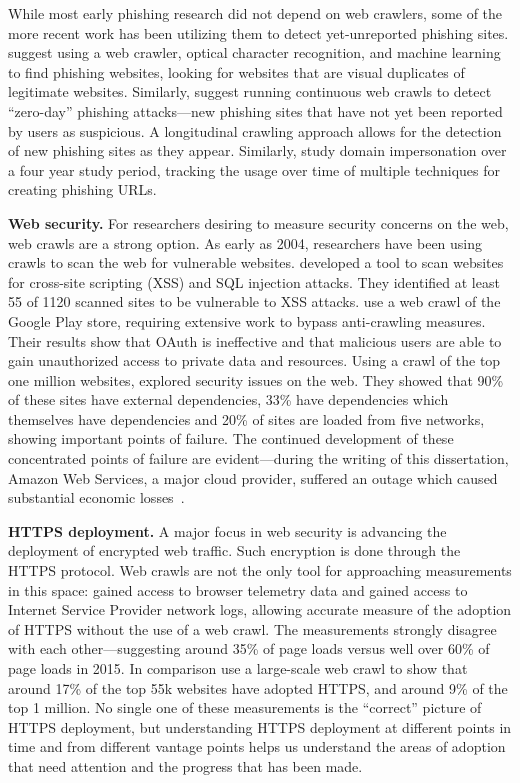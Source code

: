 While most early phishing research did not depend on web crawlers, some of the more recent work has been utilizing them to detect yet-unreported phishing sites. \citet{tian2018needle} suggest using a web crawler, optical character recognition, and machine learning to find phishing websites, looking for websites that are visual duplicates of legitimate websites. Similarly, \citet{nathezhtha2019wc} suggest running continuous web crawls to detect ``zero-day'' phishing attacks---new phishing sites that have not yet been reported by users as suspicious. A longitudinal crawling approach allows for the detection of new phishing sites as they appear. Similarly, \citet{roberts2019you} study domain impersonation over a four year study period, tracking the usage over time of multiple techniques for creating phishing URLs. 

\textbf{Web security.}
For researchers desiring to measure security concerns on the web, web crawls are a strong option. As early as 2004, researchers have been using crawls to scan the web for vulnerable websites. \citet{huang2004non} developed a tool to scan websites for cross-site scripting (XSS) and SQL injection attacks. They identified at least 55 of 1120 scanned sites to be vulnerable to XSS attacks. \citet{viennot2014measurement} use a web crawl of the Google Play store, requiring extensive work to bypass anti-crawling measures. Their results show that OAuth is ineffective and that malicious users are able to gain unauthorized access to private data and resources. Using a crawl of the top one million websites, \citet{kumar2017security} explored security issues on the web. They showed that 90\% of these sites have external dependencies, 33\% have dependencies which themselves have dependencies and 20\% of sites are loaded from five networks, showing important points of failure. The continued development of these concentrated points of failure are evident---during the writing of this dissertation, Amazon Web Services, a major cloud provider, suffered an outage which caused substantial economic losses~\cite{cnbc2021awsoutage}.

\textbf{HTTPS deployment.}
A major focus in web security is advancing the deployment of encrypted web traffic. Such encryption is done through the HTTPS protocol. Web crawls are not the only tool for approaching measurements in this space: \citet{felt2017measuring} gained access to browser telemetry data and \citet{chan2018monitoring} gained access to Internet Service Provider network logs, allowing accurate measure of the adoption of HTTPS without the use of a web crawl. The measurements strongly disagree with each other---suggesting around 35\% of page loads versus well over 60\% of page loads in 2015. In comparison \citet{englehardt2015cookies} use a large-scale web crawl to show that around 17\% of the top 55k websites have adopted HTTPS, and around 9\% of the top 1 million. No single one of these measurements is the ``correct'' picture of HTTPS deployment, but understanding HTTPS deployment at different points in time and from different vantage points helps us understand the areas of adoption that need attention and the progress that has been made.

